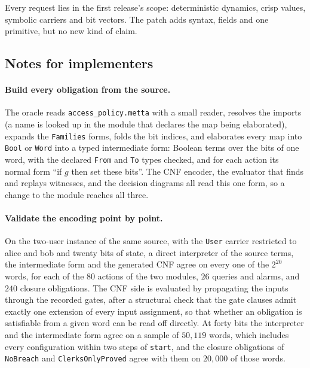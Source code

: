 \documentclass[11pt]{article}
\newcommand{\fpath}[1]{\nolinkurl{#1}}
\newcommand{\code}[1]{\texttt{#1}}
\theoremstyle{definition}
\theoremstyle{plain}
\begin{document}
Every request lies in the first release's scope: deterministic dynamics, crisp values, symbolic
carriers and bit vectors. The patch adds syntax, fields and one primitive, but no new kind of claim.

\subsection{Notes for implementers}\label{sec:ex2notes}

\paragraph{Build every obligation from the source.} The oracle reads \fpath{access_policy.metta} with
a small reader, resolves the imports (a name is looked up in the module that declares the map being
elaborated), expands the \code{Families} forms, folds the bit indices, and elaborates every map into
\code{Bool} or \code{Word} into a typed intermediate form: Boolean terms over the bits of one word,
with the declared \code{From} and \code{To} types checked, and for each action its normal form ``if
$g$ then set these bits''. The CNF encoder, the evaluator that finds and replays witnesses, and the
decision diagrams all read this one form, so a change to the module reaches all three.

\paragraph{Validate the encoding point by point.} On the two-user instance of the same source, with
the \code{User} carrier restricted to alice and bob and twenty bits of state, a direct interpreter
of the source terms, the intermediate form and the generated CNF agree on every one of the $2^{20}$
words, for each of the $80$ actions of the two modules, $26$ queries and alarms, and $240$ closure
obligations. The CNF side is evaluated by propagating the inputs through the recorded gates, after a
structural check that the gate clauses admit exactly one extension of every input assignment, so
that whether an obligation is satisfiable from a given word can be read off directly. At forty bits
the interpreter and the intermediate form agree on a sample of $50{,}119$ words, which includes every
configuration within two steps of \code{start}, and the closure obligations of \code{NoBreach} and
\code{ClerksOnlyProved} agree with them on $20{,}000$ of those words.
\end{document}
